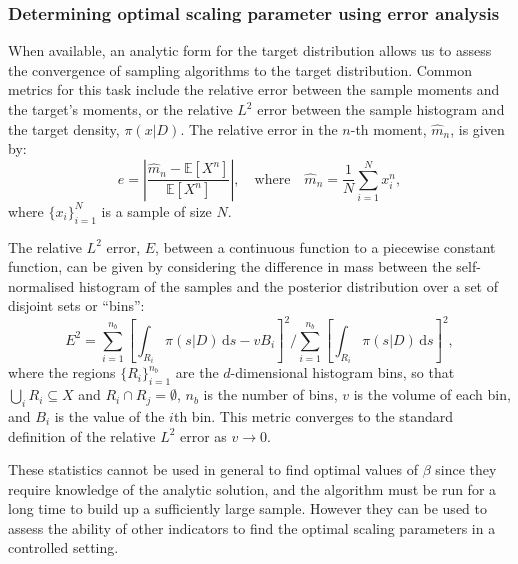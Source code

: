 \documentclass[final]{siamltex}
\begin{document}
\subsubsection{Determining optimal scaling parameter using error analysis}


When available, an analytic form for the target distribution allows us
to assess the convergence of sampling algorithms to the target
distribution. Common metrics for this task include the relative error
between the sample moments and the target's moments, or the
relative $L^2$ error between the sample histogram and the target
density, $\pi(x|D)$. The relative error in the $n$-th moment,
$\hat{m}_n$, is given by:
\begin{equation}\label{eq:34567}
	e = \left|\frac{\hat{m}_n - \mathbb{E}[X^n]}{\mathbb{E}[X^n]}\right|, \quad \text{where} \quad \hat{m}_n = \frac{1}{N}\sum_{i=1}^N \! x_i^n,
\end{equation}
where $\{x_i\}_{i=1}^N$ is a sample of size $N$.

The relative $L^2$ error, $E$, between a continuous function to a
piecewise constant function, can be given by considering the
difference in mass between the self-normalised histogram of the
samples and the posterior distribution over a set of disjoint sets or
``bins'':
\begin{equation}\label{eqn:L2_error}
	E^2 = \sum\limits_{i=1}^{n_b}\left[\displaystyle\int_{R_i} \! \pi(s|D) \, \mbox{d}s - vB_i\right]^2 \Big/ \sum\limits_{i=1}^{n_b}\left[\displaystyle\int_{R_i} \! \pi(s|D) \, \mbox{d}s\right]^2,
\end{equation}
where the regions $\{R_i\}_{i=1}^{n_b}$ are the $d$-dimensional
histogram bins, so that $\bigcup_i R_i \subseteq X$ and
$R_i\cap R_j=\emptyset$, $n_b$ is the number of bins, $v$ is the
volume of each bin, and $B_i$ is the value of the $i$th bin. This
metric converges to the standard definition of the relative $L^2$
error as $v\rightarrow 0$.

These statistics cannot be used in general to find optimal values of
$\beta$ since they require knowledge of the analytic solution, and
the algorithm must be run for a long time to build up a
sufficiently large sample. However they can be used to assess the
ability of other indicators to find the optimal scaling parameters in
a controlled setting.
\end{document}
